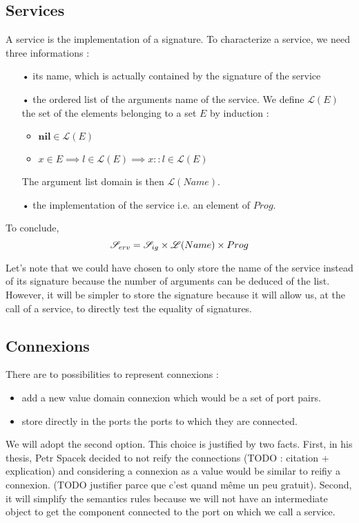 \subsection{Services}
A service is the implementation of a signature. To characterize a service, we need three informations : 
\begin{itemize}
\item[•] its \textsf{name}, which is actually contained by the signature of the service
\item[•] the ordered list of the arguments name of the service. We define $\mathcal{L}(E)$
the set of the elements belonging to a set $E$ by induction : 
\begin{itemize}
\item $ \mathbf{nil} \in \mathcal{L}(E)$
\item $ x \in E  \implies l \in \mathcal{L}(E) \implies x::l \in \mathcal{L}(E) $
\end{itemize}
The argument list domain is then $\mathcal{L}(Name)$.
\item[•] the \textsf{implementation} of the service i.e. an element of $Prog$.
\end{itemize}
To conclude, 
\[\mathcal{S}_{erv} = \mathcal{S}_{ig} \times \mathcal{L}(Name)\times Prog\]

Let's note that we could have chosen to only store the name of the service instead of its signature because the number of arguments can be deduced of the list. However, it will be simpler to store the signature because it will allow us, at the call of a service, to directly test the equality of signatures.


\subsection{Connexions} There are to possibilities to represent connexions :
\begin{itemize}
\item add a new value domain \textsf{connexion} which would be a set of port pairs. 
\item store directly in the ports the ports to which they are connected.
\end{itemize}

We will adopt the second option. This choice is justified by two facts. First, in his thesis, Petr Spacek decided to not reify the connections (TODO : citation + explication) and considering a connexion as a value would be similar to reifiy a connexion. (TODO justifier parce que c'est quand même un peu gratuit).  Second, it will simplify the semantics rules because we will not have an intermediate object to get the component connected to the port on which we call a service.

